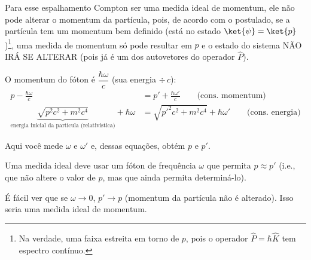 \begin{center}
\end{center}

Para esse espalhamento Compton ser uma medida ideal de momentum, ele não pode alterar o momentum da partícula, pois, de acordo com o postulado, se a partícula tem um momentum bem definido (está no estado $\ket{\psi} = \ket{p}$)\footnote{Na verdade, uma faixa estreita em torno de $p$, pois o operador $\hat{P} = \hbar\hat{K}$ tem espectro contínuo.}, uma medida de momentum só pode resultar em $p$ e o estado do sistema NÃO IRÁ SE ALTERAR (pois já é um dos autovetores do operador $\hat{P}$).

O momentum do fóton é $\dfrac{\hbar\omega}{c}$ (sua energia $\div\, c$):
\begin{align}
p - \frac{\hbar\omega}{c} &= p' + \frac{\hbar\omega'}{c} \qquad \text{(cons. momentum)}\\
\underbrace{\sqrt{p^2c^2 + m^2c^4}}_{\text{energia inicial da partícula (relativística)}} + \hbar\omega &= \sqrt{p'^2c^2 + m^2c^4} + \hbar\omega' \qquad \text{(cons. energia)}
\end{align}

Aqui você mede $\omega$ e $\omega'$ e, dessas equações, obtém $p$ e $p'$.

Uma medida ideal deve usar um fóton de frequência $\omega$ que permita $p \approx p'$ (i.e., que não altere o valor de $p$, mas que ainda permita determiná-lo).

É fácil ver que se $\omega \to 0$, $p' \to p$ (momentum da partícula não é alterado). Isso seria uma medida ideal de momentum.



